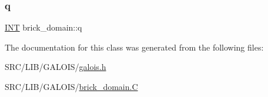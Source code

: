 \mbox{\label{classbrick__domain_a033ed6bb9795ceb3e85240e5fc04cdbc}} 
\subsubsection{\texorpdfstring{q}{q}}
{\footnotesize\ttfamily \mbox{\hyperlink{galois_8h_a09fddde158a3a20bd2dcadb609de11dc}{I\+NT}} brick\+\_\+domain\+::q}



The documentation for this class was generated from the following files\+:\begin{DoxyCompactItemize}
\item 
S\+R\+C/\+L\+I\+B/\+G\+A\+L\+O\+I\+S/\mbox{\hyperlink{galois_8h}{galois.\+h}}\item 
S\+R\+C/\+L\+I\+B/\+G\+A\+L\+O\+I\+S/\mbox{\hyperlink{brick__domain_8_c}{brick\+\_\+domain.\+C}}\end{DoxyCompactItemize}
